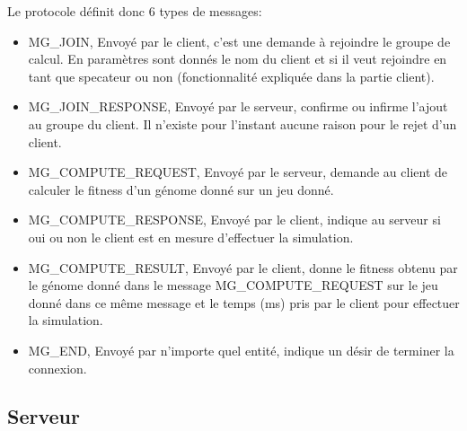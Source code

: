 \documentclass{article}
\begin{document}
Le protocole définit donc 6 types de messages:
\begin{itemize}
\item MG\_JOIN, Envoyé par le client, c'est une demande à rejoindre le groupe de calcul. En paramètres sont donnés le nom du client et si il veut rejoindre en tant que specateur ou non (fonctionnalité expliquée dans la partie client).

\item MG\_JOIN\_RESPONSE, Envoyé par le serveur, confirme ou infirme l'ajout au groupe du client. Il n'existe pour l'instant aucune raison pour le rejet d'un client.

\item MG\_COMPUTE\_REQUEST, Envoyé par le serveur, demande au client de calculer le fitness d'un génome donné sur un jeu donné.

\item MG\_COMPUTE\_RESPONSE, Envoyé par le client, indique au serveur si oui ou non le client est en mesure d'effectuer la simulation.

\item MG\_COMPUTE\_RESULT, Envoyé par le client, donne le fitness obtenu par le génome donné dans le message MG\_COMPUTE\_REQUEST sur le jeu donné dans ce même message et le temps (ms) pris par le client pour effectuer la simulation.

\item MG\_END, Envoyé par n'importe quel entité, indique un désir de terminer la connexion.

\end{itemize}

\subsection{Serveur}
\end{document}
